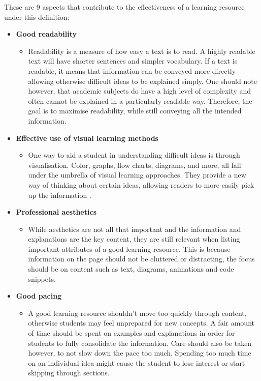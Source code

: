 These are 9 aspects that contribute to the effectiveness of a learning resource under this definition:

\begin{itemize}
    \item \textbf{Good readability} 
        \begin{itemize}
            \item Readability is a measure of how easy a text is to read. A highly readable text will have shorter sentences and simpler vocabulary. If a text is readable, it means that information can be conveyed more directly allowing otherwise difficult ideas to be explained simply. One should note however, that academic subjects do have a high level of complexity and often cannot be explained in a particularly readable way. Therefore, the goal is to maximise readability, while still conveying all the intended information.
        \end{itemize}
    \item \textbf{Effective use of visual learning methods}
        \begin{itemize}
            \item One way to aid a student in understanding difficult ideas is through visualisation. Color, graphs, flow charts, diagrams, and more, all fall under the umbrella of visual learning approaches. They provide a new way of thinking about certain ideas, allowing readers to more easily pick up the information \cite{times-higher-education}.
        \end{itemize}
    \item \textbf{Professional aesthetics}
        \begin{itemize}
            \item While aesthetics are not all that important and the information and explanations are the key content, they are still relevant when listing important attributes of a good learning resource. This is because information on the page should not be cluttered or distracting, the focus should be on content such as text, diagrams, animations and code snippets.
        \end{itemize}
    \item \textbf{Good pacing}
        \begin{itemize}
            \item A good learning resource shouldn't move too quickly through content, otherwise students may feel unprepared for new concepts. A fair amount of time should be spent on examples and explanations in order for students to fully consolidate the information. Care should also be taken however, to not slow down the pace too much. Spending too much time on an individual idea might cause the student to lose interest or start skipping through sections.

\end{itemize}
\end{itemize}
